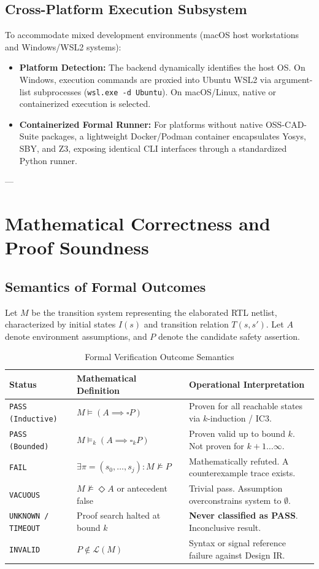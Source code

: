 \documentclass[11pt,a4paper]{article}
\begin{document}
\subsection{Cross-Platform Execution Subsystem}
To accommodate mixed development environments (macOS host workstations and Windows/WSL2 systems):
\begin{itemize}
    \item \textbf{Platform Detection:} The backend dynamically identifies the host OS. On Windows, execution commands are proxied into Ubuntu WSL2 via argument-list subprocesses (\texttt{wsl.exe -d Ubuntu}). On macOS/Linux, native or containerized execution is selected.
    \item \textbf{Containerized Formal Runner:} For platforms without native OSS-CAD-Suite packages, a lightweight Docker/Podman container encapsulates Yosys, SBY, and Z3, exposing identical CLI interfaces through a standardized Python runner.
\end{itemize}

---

\section{Mathematical Correctness and Proof Soundness}

\subsection{Semantics of Formal Outcomes}
Let $M$ be the transition system representing the elaborated RTL netlist, characterized by initial states $I(s)$ and transition relation $T(s, s')$. Let $A$ denote environment assumptions, and $P$ denote the candidate safety assertion.

\begin{table}[htbp]
\centering
\caption{Formal Verification Outcome Semantics}
\label{tab:outcomes}
\begin{tabular}{lll}
\toprule
\textbf{Status} & \textbf{Mathematical Definition} & \textbf{Operational Interpretation} \\
\midrule
\texttt{PASS (Inductive)} & $M \models (A \implies \square P)$ & Proven for all reachable states via $k$-induction / IC3. \\
\texttt{PASS (Bounded)} & $M \models_k (A \implies \square_k P)$ & Proven valid up to bound $k$. Not proven for $k+1 \dots \infty$. \\
\texttt{FAIL} & $\exists \pi = (s_0, \dots, s_j): M \not\models P$ & Mathematically refuted. A counterexample trace exists. \\
\texttt{VACUOUS} & $M \not\models \Diamond A$ or antecedent false & Trivial pass. Assumption overconstrains system to $\emptyset$. \\
\texttt{UNKNOWN / TIMEOUT} & Proof search halted at bound $k$ & \textbf{Never classified as PASS}. Inconclusive result. \\
\texttt{INVALID} & $P \notin \mathcal{L}(M)$ & Syntax or signal reference failure against Design IR. \\
\bottomrule
\end{tabular}
\end{table}
\end{document}
